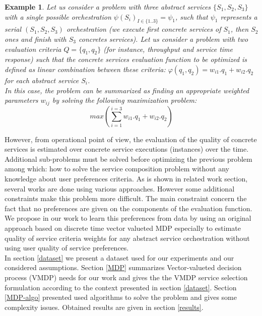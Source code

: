 \documentclass[10pt,journal,compsoc]{IEEEtran}
\newtheorem{example}{Example}
\begin{document}
\begin{example} Let us consider a problem with three abstract services $\{S_1,S_2,S_3\}$ with a single possible orchestration $\psi(S_i)_{I\in\{1..3\}}=\psi_1$, such that $\psi_1$ represents a serial $(S_1,S_2,S_3)$ orchestration (we execute first concrete services of $S_1$, then $S_2$ ones and finish with $S_3$ concretes services). Let us consider a problem with two evaluation criteria $Q=\{q_1,q_2\}$ (for instance, throughput and service time response) such that the concrete services evaluation function to be optimized is defined as linear combination between these criteria: $\varphi(q_1,q_2)= w_{i1}.q_1+w_{i2}.q_2$ for each abstract service $S_i$. \\
In this case, the problem can be summarized as finding an appropriate weighted parameters $w_{ij}$ by solving the following maximization problem:
$$ max(\sum_{i=1}^{i=3} w_{i1}.q_1+w_{i2}.q_2)$$
\end{example}
However, from operational point of view, the evaluation of the quality of concrete services is estimated over concrete service executions (instances) over the time. Additional sub-problems must be solved before optimizing the previous problem among which: how to solve the service composition problem without any knowledge about user preferences criteria. 
As is shown in related work section, several works are done using various approaches. However some additional constraints make this problem more difficult. The main constraint concern the fact that no preferences are given on the components of the evaluation function. We propose in our work to learn this preferences from data by using an original approach based on discrete time vector valueted MDP especially to estimate quality of service criteria weights for any abstract service orchestration without using user quality of service preferences.\\
 In section \ref{dataset} we present a dataset used for our experiments and our considered assumptions. Section \ref{MDP} summarizes Vector-valueted decision process (VMDP) needs for our work and gives the  the VMDP service selection formulation according to the context presented in section \ref{dataset}.  Section \ref{MDP-algo} presented used algorithms to solve the problem and gives some complexity issues. Obtained results are given in section \ref{results}. 
 
\end{document}
